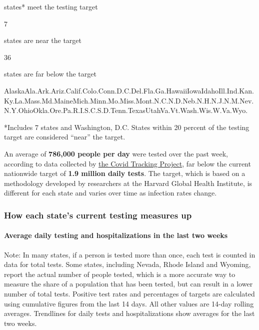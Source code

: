 states* meet the testing target

7

states are near the target

36

states are far below the target

AlaskaAla.Ark.Ariz.Calif.Colo.Conn.D.C.Del.Fla.Ga.HawaiiIowaIdahoIll.Ind.Kan.Ky.La.Mass.Md.MaineMich.Minn.Mo.Miss.Mont.N.C.N.D.Neb.N.H.N.J.N.M.Nev.N.Y.OhioOkla.Ore.Pa.R.I.S.C.S.D.Tenn.TexasUtahVa.Vt.Wash.Wis.W.Va.Wyo.

*Includes 7 states and Washington, D.C. States within 20 percent of the
testing target are considered ``near'' the target.

An average of \textbf{786,000 people per day} were tested over the past
week, according to data collected by
\href{https://covidtracking.com/}{the Covid Tracking Project}, far below
the current nationwide target of \textbf{1.9 million daily tests}. The
target, which is based on a methodology developed by researchers at the
Harvard Global Health Institute, is different for each state and varies
over time as infection rates change.

\hypertarget{how-each-states-current-testing-measures-up}{%
\subsubsection{How each state's current testing measures
up}\label{how-each-states-current-testing-measures-up}}

\hypertarget{average-daily-testing-and-hospitalizations-in-the-last-two-weeks}{%
\paragraph{Average daily testing and hospitalizations in the last two
weeks}\label{average-daily-testing-and-hospitalizations-in-the-last-two-weeks}}

Note: In many states, if a person is tested more than once, each test is
counted in data for total tests. Some states, including Nevada, Rhode
Island and Wyoming, report the actual number of people tested, which is
a more accurate way to measure the share of a population that has been
tested, but can result in a lower number of total tests. Positive test
rates and percentages of targets are calculated using cumulative figures
from the last 14 days. All other values are 14-day rolling averages.
Trendlines for daily tests and hospitalizations show averages for the
last two weeks.

